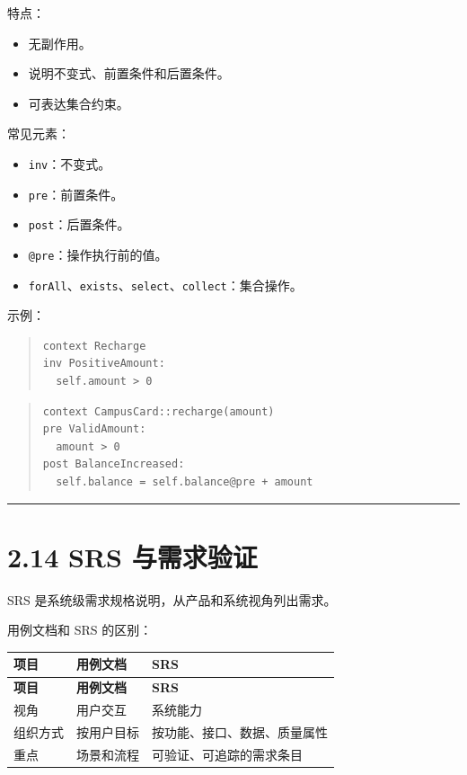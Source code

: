\documentclass[UTF8,zihao=-4]{ctexart}
\begin{document}
特点：

\begin{itemize}
\item 无副作用。
\item 说明不变式、前置条件和后置条件。
\item 可表达集合约束。
\end{itemize}

常见元素：

\begin{itemize}
\item \texttt{inv}：不变式。
\item \texttt{pre}：前置条件。
\item \texttt{post}：后置条件。
\item \texttt{@pre}：操作执行前的值。
\item \texttt{forAll}、\texttt{exists}、\texttt{select}、\texttt{collect}：集合操作。
\end{itemize}

示例：

\begin{quote}
\footnotesize
\begin{verbatim}
context Recharge
inv PositiveAmount:
  self.amount > 0
\end{verbatim}
\end{quote}

\begin{quote}
\footnotesize
\begin{verbatim}
context CampusCard::recharge(amount)
pre ValidAmount:
  amount > 0
post BalanceIncreased:
  self.balance = self.balance@pre + amount
\end{verbatim}
\end{quote}

\bigskip\hrule\bigskip

\section{2.14 SRS 与需求验证}

SRS 是系统级需求规格说明，从产品和系统视角列出需求。

用例文档和 SRS 的区别：

{
\footnotesize
\begin{longtable}{|>{\raggedright\arraybackslash}p{}|>{\raggedright\arraybackslash}p{}|>{\raggedright\arraybackslash}p{}|}
\hline
\textbf{项目} & \textbf{用例文档} & \textbf{SRS} \\
\hline
\endfirsthead
\hline
\textbf{项目} & \textbf{用例文档} & \textbf{SRS} \\
\hline
\endhead
视角 & 用户交互 & 系统能力 \\
\hline
组织方式 & 按用户目标 & 按功能、接口、数据、质量属性 \\
\hline
重点 & 场景和流程 & 可验证、可追踪的需求条目 \\
\hline
\end{longtable}
}
\end{document}
